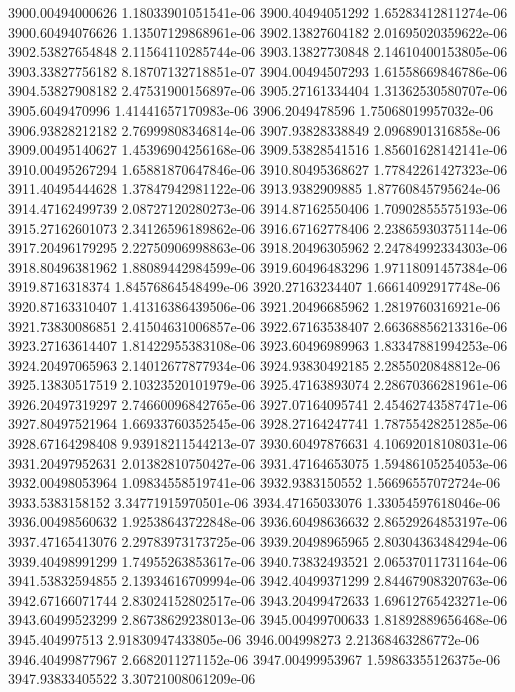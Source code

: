 {3900.00494000626 1.18033901051541e-06
3900.40494051292 1.65283412811274e-06
3900.60494076626 1.13507129868961e-06
3902.13827604182 2.01695020359622e-06
3902.53827654848 2.11564110285744e-06
3903.13827730848 2.14610400153805e-06
3903.33827756182 8.18707132718851e-07
3904.00494507293 1.61558669846786e-06
3904.53827908182 2.47531900156897e-06
3905.27161334404 1.31362530580707e-06
3905.6049470996 1.41441657170983e-06
3906.2049478596 1.75068019957032e-06
3906.93828212182 2.76999808346814e-06
3907.93828338849 2.0968901316858e-06
3909.00495140627 1.45396904256168e-06
3909.53828541516 1.85601628142141e-06
3910.00495267294 1.65881870647846e-06
3910.80495368627 1.77842261427323e-06
3911.40495444628 1.37847942981122e-06
3913.9382909885 1.87760845795624e-06
3914.47162499739 2.08727120280273e-06
3914.87162550406 1.70902855575193e-06
3915.27162601073 2.34126596189862e-06
3916.67162778406 2.23865930375114e-06
3917.20496179295 2.22750906998863e-06
3918.20496305962 2.24784992334303e-06
3918.80496381962 1.88089442984599e-06
3919.60496483296 1.97118091457384e-06
3919.8716318374 1.84576864548499e-06
3920.27163234407 1.66614092917748e-06
3920.87163310407 1.41316386439506e-06
3921.20496685962 1.2819760316921e-06
3921.73830086851 2.41504631006857e-06
3922.67163538407 2.66368856213316e-06
3923.27163614407 1.81422955383108e-06
3923.60496989963 1.83347881994253e-06
3924.20497065963 2.14012677877934e-06
3924.93830492185 2.2855020848812e-06
3925.13830517519 2.10323520101979e-06
3925.47163893074 2.28670366281961e-06
3926.20497319297 2.74660096842765e-06
3927.07164095741 2.45462743587471e-06
3927.80497521964 1.66933760352545e-06
3928.27164247741 1.78755428251285e-06
3928.67164298408 9.93918211544213e-07
3930.60497876631 4.10692018108031e-06
3931.20497952631 2.01382810750427e-06
3931.47164653075 1.59486105254053e-06
3932.00498053964 1.09834558519741e-06
3932.9383150552 1.56696557072724e-06
3933.5383158152 3.34771915970501e-06
3934.47165033076 1.33054597618046e-06
3936.00498560632 1.92538643722848e-06
3936.60498636632 2.86529264853197e-06
3937.47165413076 2.29783973173725e-06
3939.20498965965 2.80304363484294e-06
3939.40498991299 1.74955263853617e-06
3940.73832493521 2.06537011731164e-06
3941.53832594855 2.13934616709994e-06
3942.40499371299 2.84467908320763e-06
3942.67166071744 2.83024152802517e-06
3943.20499472633 1.69612765423271e-06
3943.60499523299 2.86738629238013e-06
3945.00499700633 1.81892889656468e-06
3945.404997513 2.91830947433805e-06
3946.004998273 2.21368463286772e-06
3946.40499877967 2.6682011271152e-06
3947.00499953967 1.59863355126375e-06
3947.93833405522 3.30721008061209e-06
}
